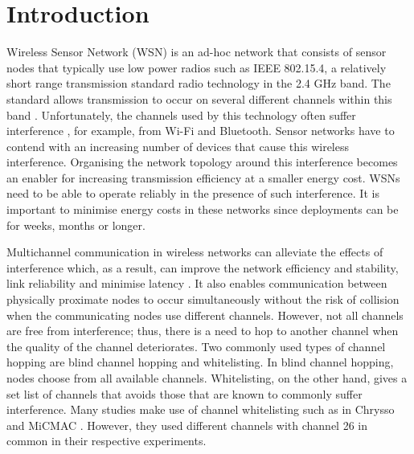 \section{Introduction}
\label{sec:introduction}
Wireless Sensor Network (WSN) is an ad-hoc network that consists of sensor nodes that typically use low power radios such as IEEE 802.15.4, a relatively short range transmission standard radio technology in the 2.4 GHz band. The standard allows transmission to occur on several different channels within this band \cite{ieee802.15.4}. Unfortunately, the channels used by this technology often suffer interference \cite{Boano:2010:MSM:2127940.2127963, ieeeCompare}, for example, from Wi-Fi \cite{ieee_2012, wu} and Bluetooth. Sensor networks have to contend with an increasing number of devices that cause this wireless interference. Organising the network topology around this interference becomes an enabler for increasing transmission efficiency at a smaller energy cost. WSNs need to be able to operate reliably in the presence of such interference. It is important to minimise energy costs in these networks since deployments can be for weeks, months or longer.

Multichannel communication in wireless networks can alleviate the effects of interference which, as a result, can improve the network efficiency and stability, link reliability and minimise latency \cite{watteyne}. It also enables communication between physically proximate nodes to occur simultaneously without the risk of collision when the communicating nodes use different channels. However, not all channels are free from interference; thus, there is a need to hop to another channel when the quality of the channel deteriorates. Two commonly used types of channel hopping \cite{watteyne} are blind channel hopping and whitelisting. In blind channel hopping, nodes choose from all available channels. 
Whitelisting, on the other hand, gives a set list of channels that avoids those that are known to commonly suffer interference.
Many studies make use of channel whitelisting such as in Chrysso \cite{chrysso} and MiCMAC \cite{micmac}. However, they used different channels with channel 26 in common in their respective experiments. 

